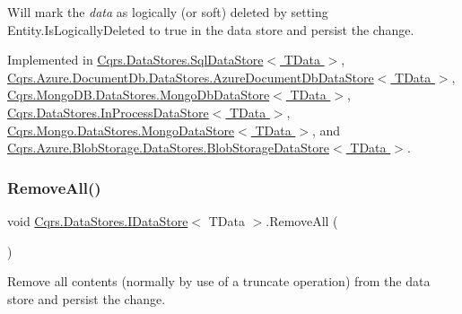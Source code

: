 Will mark the {\itshape data}  as logically (or soft) deleted by setting Entity.\+Is\+Logically\+Deleted to true in the data store and persist the change. 



Implemented in \hyperlink{classCqrs_1_1DataStores_1_1SqlDataStore_a898d15db199f054865a96ac646bf54fb}{Cqrs.\+Data\+Stores.\+Sql\+Data\+Store$<$ T\+Data $>$}, \hyperlink{classCqrs_1_1Azure_1_1DocumentDb_1_1DataStores_1_1AzureDocumentDbDataStore_abf9bcf75e8e0e1ec86155bf4da1a7b7a}{Cqrs.\+Azure.\+Document\+Db.\+Data\+Stores.\+Azure\+Document\+Db\+Data\+Store$<$ T\+Data $>$}, \hyperlink{classCqrs_1_1MongoDB_1_1DataStores_1_1MongoDbDataStore_a14b43546e8d1e1832358e1cf2f8535f1}{Cqrs.\+Mongo\+D\+B.\+Data\+Stores.\+Mongo\+Db\+Data\+Store$<$ T\+Data $>$}, \hyperlink{classCqrs_1_1DataStores_1_1InProcessDataStore_a43a93c614a403181e0641106ca9509d6}{Cqrs.\+Data\+Stores.\+In\+Process\+Data\+Store$<$ T\+Data $>$}, \hyperlink{classCqrs_1_1Mongo_1_1DataStores_1_1MongoDataStore_a64003d01de3ac6ffd0e41bb7f572bf96}{Cqrs.\+Mongo.\+Data\+Stores.\+Mongo\+Data\+Store$<$ T\+Data $>$}, and \hyperlink{classCqrs_1_1Azure_1_1BlobStorage_1_1DataStores_1_1BlobStorageDataStore_af054d4134671d66981c4d91df5c1d481}{Cqrs.\+Azure.\+Blob\+Storage.\+Data\+Stores.\+Blob\+Storage\+Data\+Store$<$ T\+Data $>$}.

\mbox{\label{interfaceCqrs_1_1DataStores_1_1IDataStore_aead8d7a39a717d29af05daf7b64bea94}} 
\subsubsection{\texorpdfstring{Remove\+All()}{RemoveAll()}}
{\footnotesize\ttfamily void \hyperlink{interfaceCqrs_1_1DataStores_1_1IDataStore}{Cqrs.\+Data\+Stores.\+I\+Data\+Store}$<$ T\+Data $>$.Remove\+All (\begin{DoxyParamCaption}{ }\end{DoxyParamCaption})}



Remove all contents (normally by use of a truncate operation) from the data store and persist the change. 



